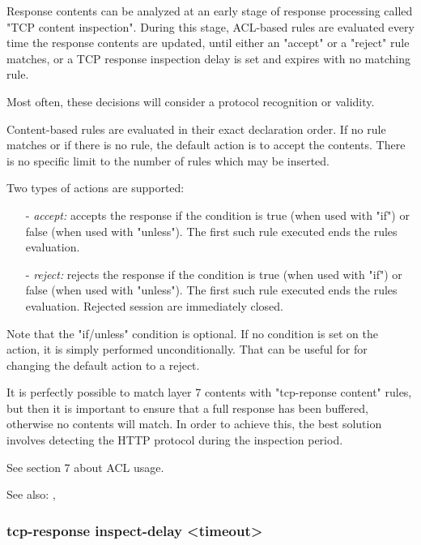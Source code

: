   Response contents can be analyzed at an early stage of response processing
  called "TCP content inspection". During this stage, ACL-based rules are
  evaluated every time the response contents are updated, until either an
  "accept" or a "reject" rule matches, or a TCP response inspection delay is
  set and expires with no matching rule.

  Most often, these decisions will consider a protocol recognition or validity.

  Content-based rules are evaluated in their exact declaration order. If no
  rule matches or if there is no rule, the default action is to accept the
  contents. There is no specific limit to the number of rules which may be
  inserted.

  Two types of actions are supported:
  \begin{itemize}
  \item[-] \emph{accept:}
        accepts the response if the condition is true (when used with "if")
        or false (when used with "unless"). The first such rule executed ends
        the rules evaluation.

  \item[-] \emph{reject:}
        rejects the response if the condition is true (when used with "if")
        or false (when used with "unless"). The first such rule executed ends
        the rules evaluation. Rejected session are immediately closed.
  \end{itemize}

  Note that the "if/unless" condition is optional. If no condition is set on
  the action, it is simply performed unconditionally. That can be useful for
  for changing the default action to a reject.

  It is perfectly possible to match layer 7 contents with "tcp-reponse content"
  rules, but then it is important to ensure that a full response has been
  buffered, otherwise no contents will match. In order to achieve this, the
  best solution involves detecting the HTTP protocol during the inspection
  period.

  See section 7 about ACL usage.

  See also: , 

\subsubsection[tcp-response]{tcp-response inspect-delay <timeout>}

